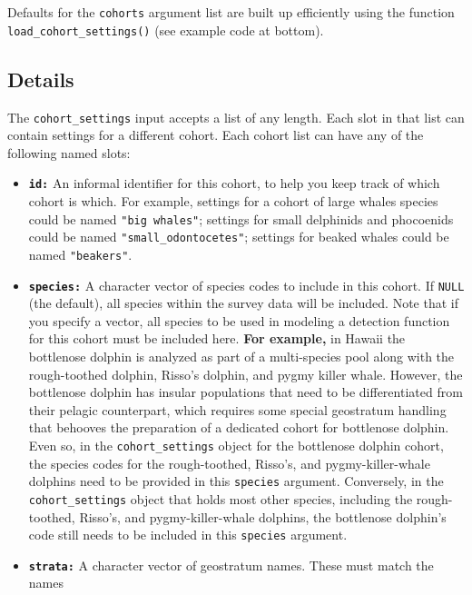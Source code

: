 \documentclass[
]{book}
\begin{document}
Defaults for the \texttt{cohorts} argument list are built up efficiently using the function \texttt{load\_cohort\_settings()} (see example code at bottom).

\hypertarget{details-1}{%
\subsection*{Details}\label{details-1}}

The \texttt{cohort\_settings} input accepts a list of any length. Each slot in that list can contain settings for a different cohort. Each cohort list can have any of the following named slots:

\begin{itemize}
\item
  \textbf{\texttt{id:}} An informal identifier for this cohort, to help you keep track of which cohort is which. For example, settings for a cohort of large whales species could be named \texttt{"big\ whales"}; settings for small delphinids and phocoenids could be named \texttt{"small\_odontocetes"}; settings for beaked whales could be named \texttt{"beakers"}.
\item
  \textbf{\texttt{species:}} A character vector of species codes to include in this cohort. If \texttt{NULL} (the default), all species within the survey data will be included. Note that if you specify a vector, all species to be used in modeling a detection function for this cohort must be included here. \textbf{For example,} in Hawaii the bottlenose dolphin is analyzed as part of a multi-species pool along with the rough-toothed dolphin, Risso's dolphin, and pygmy killer whale. However, the bottlenose dolphin has insular populations that need to be differentiated from their pelagic counterpart, which requires some special geostratum handling that behooves the preparation of a dedicated cohort for bottlenose dolphin. Even so, in the \texttt{cohort\_settings} object for the bottlenose dolphin cohort, the species codes for the rough-toothed, Risso's, and pygmy-killer-whale dolphins need to be provided in this \texttt{species} argument. Conversely, in the \texttt{cohort\_settings} object that holds most other species, including the rough-toothed, Risso's, and pygmy-killer-whale dolphins, the bottlenose dolphin's code still needs to be included in this \texttt{species} argument.
\item
  \textbf{\texttt{strata:}} A character vector of geostratum names. These must match the names

\end{itemize}
\end{document}
